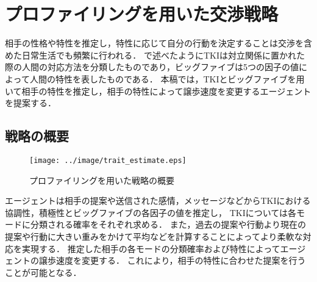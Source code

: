 

\chapter{プロファイリングを用いた交渉戦略}
\label{chap:profiling}
相手の性格や特性を推定し，特性に応じて自分の行動を決定することは交渉を含めた日常生活でも頻繁に行われる．
で述べたようにTKIは対立関係に置かれた際の人間の対応方法を分類したものであり，ビッグファイブは5つの因子の値によって人間の特性を表したものである．
本稿では，TKIとビッグファイブを用いて相手の特性を推定し，相手の特性によって譲歩速度を変更するエージェントを提案する．

\section{戦略の概要}
\begin{figure}[tb]
    \centering
    \texttt{[image: ../image/trait\_estimate.eps]}
    \caption{プロファイリングを用いた戦略の概要}
    \label{fig:trait_estimate}
\end{figure}
エージェントは相手の提案や送信された感情，メッセージなどからTKIにおける協調性，積極性とビッグファイブの各因子の値を推定し，
TKIについては各モードに分類される確率をそれぞれ求める．
また，過去の提案や行動より現在の提案や行動に大きい重みをかけて平均などを計算することによってより柔軟な対応を実現する．
推定した相手の各モードの分類確率および特性によってエージェントの譲歩速度を変更する．
これにより，相手の特性に合わせた提案を行うことが可能となる．

